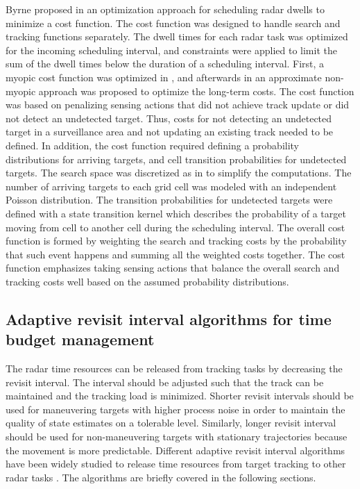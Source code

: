 \documentclass[english, 12pt, a4paper, elec, utf8, a-1b, online]{aaltothesis}
\begin{document}
Byrne proposed in \cite{Byrne2015, Byrne2016} an optimization approach for scheduling radar dwells to minimize a cost function. 
The cost function was designed to handle search and tracking functions separately.
The dwell times for each radar task was optimized for the incoming scheduling interval, and constraints were applied to limit the sum of the dwell times below the duration of a scheduling interval.
First, a myopic cost function was optimized in \cite{Byrne2015}, and afterwards in \cite{Byrne2016} an approximate non-myopic approach was proposed to optimize the long-term costs.
The cost function was based on penalizing sensing actions that did not achieve track update or did not detect an undetected target.
Thus, costs for not detecting an undetected target in a surveillance area and not updating an existing track needed to be defined.
In addition, the cost function required defining a probability distributions for arriving targets, and cell transition probabilities for undetected targets.
The search space was discretized as in \cite{Kreucher2004} to simplify the computations.
The number of arriving targets to each grid cell was modeled with an independent Poisson distribution.
The transition probabilities for undetected targets were defined with a state transition kernel which describes the probability of a target moving from cell to another cell during the scheduling interval.
The overall cost function is formed by weighting the search and tracking costs by the probability that such event happens and summing all the weighted costs together.
The cost function emphasizes taking sensing actions that balance the overall search and tracking costs well based on the assumed probability distributions.

\subsection{Adaptive revisit interval algorithms for time budget management} \label{sec:tbm_ri}

The radar time resources can be released from tracking tasks by decreasing the revisit interval. 
The interval should be adjusted such that the track can be maintained and the tracking load is minimized.
Shorter revisit intervals should be used for maneuvering targets with higher process noise in order to maintain the quality of state estimates on a tolerable level. 
Similarly, longer revisit interval should be used for non-maneuvering targets with stationary trajectories because the movement is more predictable.
Different adaptive revisit interval algorithms have been widely studied to release time resources from target tracking to other radar tasks \cite{Cohen1986, Gardner1988, Munu1992, ChengTing2007, Baek2010, Watson1993, Charlish2015, Keuk1975, Shin1995, Benoudnine2006, Esfahani2012, Zamani2017, Christiansen2018, Pilte2018}.
The algorithms are briefly covered in the following sections. 
\end{document}
